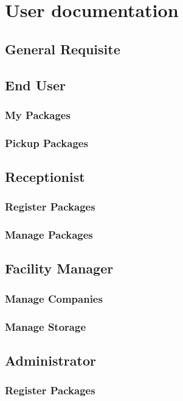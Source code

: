\chapter{User documentation}
\label{ch:user}

\section{General Requisite}

\section{End User}
\subsection{My Packages}
\subsection{Pickup Packages}

\section{Receptionist}
\subsection{Register Packages}
\subsection{Manage Packages}

\section{Facility Manager}
\subsection{Manage Companies}
\subsection{Manage Storage}

\section{Administrator}
\subsection{Register Packages}
